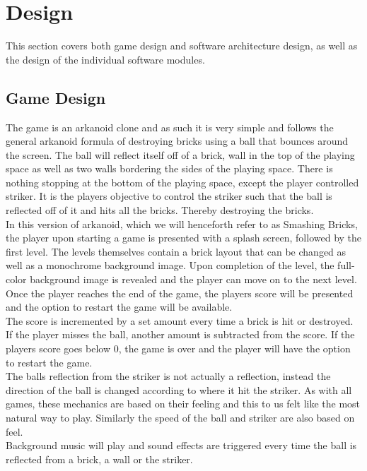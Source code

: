 \section{Design}
This section covers both game design and software architecture design, as well as the
design of the individual software modules.

\subsection{Game Design}
The game is an arkanoid clone and as such it is very simple and follows the general arkanoid formula of destroying
bricks using a ball that bounces around the screen. The ball will reflect itself off of a brick, wall
in the top of the playing space as well as two walls bordering the sides of the playing space.
There is nothing stopping at the bottom of the playing space, except the player controlled striker.
It is the players objective to control the striker such that the ball is reflected off of it and
hits all the bricks. Thereby destroying the bricks. \\

In this version of arkanoid, which we will henceforth refer to as Smashing Bricks, the player
upon starting a game is presented with a splash screen, followed by the first level. The levels
themselves contain a brick layout that can be changed as well as a monochrome background image.
Upon completion of the level, the full-color background image is revealed and the player can
move on to the next level. Once the player reaches the end of the game, the players score
will be presented and the option to restart the game will be available. \\

The score is incremented by a set amount every time a brick is hit or destroyed. If the player
misses the ball, another amount is subtracted from the score. If the players score goes below
0, the game is over and the player will have the option to restart the game. \\

The balls reflection from the striker is not actually a reflection, instead the direction
of the ball is changed according to where it hit the striker. As with all games, these
mechanics are based on their feeling and this to us felt like the most natural way to play.
Similarly the speed of the ball and striker are also based on feel. \\

Background music will play and sound effects are triggered every time the ball is reflected
from a brick, a wall or the striker. \\

